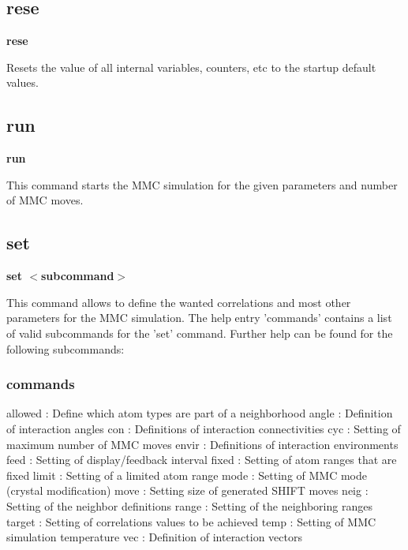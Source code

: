 \subsection*{rese}
{\bf rese \par }
\par
\vspace{3pt}
Resets the value of all internal variables, counters, etc to the 
startup default values. 
\subsection*{run}
{\bf run \par }
\par
\vspace{3pt}
This command starts the MMC simulation for the given parameters and 
number of MMC moves. 
\subsection*{set}
{\bf set $ <$subcommand$> $ \par }
\par
\vspace{3pt}
This command allows to define the wanted correlations and most other 
parameters for the MMC simulation. The help entry 'commands' contains 
a list of valid subcommands for the 'set' command. Further help can 
be found for the following subcommands: 
\par
\subsubsection{commands}
\begin{MacVerbatim}
allowed : Define which atom types are part of a neighborhood
angle   : Definition of interaction angles
con     : Definitions of interaction connectivities
cyc     : Setting of maximum number of MMC moves
envir   : Definitions of interaction environments
feed    : Setting of display/feedback interval
fixed   : Setting of atom ranges that are fixed
limit   : Setting of a limited atom range
mode    : Setting of MMC mode (crystal modification)
move    : Setting size of generated SHIFT moves
neig    : Setting of the neighbor definitions
range   : Setting of the neighboring ranges
target  : Setting of correlations values to be achieved
temp    : Setting of MMC simulation temperature
vec     : Definition of interaction vectors
\end{MacVerbatim}
